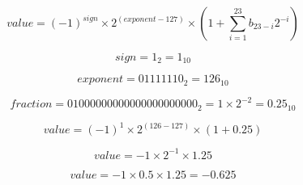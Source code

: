 $$value = (-1)^{sign} \times 2^{(exponent - 127)} \times (1 + \sum_{i=1}^{23}b_{23-i}2^{-i})$$

$$ sign = 1_{2} = 1_{10} $$

$$ exponent = 01111110_{2} = 126_{10} $$

$$ fraction = 01000000000000000000000_{2} = 1 \times 2^{-2} = 0.25_{10} $$

$$value = (-1)^{1} \times 2^{(126 - 127)} \times (1 + 0.25)$$

$$value = -1 \times 2^{-1} \times 1.25$$

$$value = -1 \times 0.5 \times 1.25 = -0.625$$
